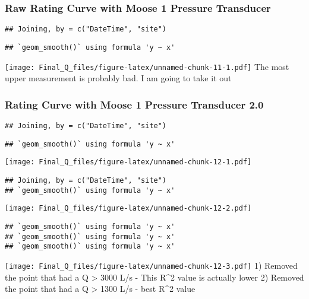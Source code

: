 \documentclass[
]{article}
\begin{document}
\hypertarget{raw-rating-curve-with-moose-1-pressure-transducer}{%
\subsubsection{Raw Rating Curve with Moose 1 Pressure
Transducer}\label{raw-rating-curve-with-moose-1-pressure-transducer}}

\begin{verbatim}
## Joining, by = c("DateTime", "site")
\end{verbatim}

\begin{verbatim}
## `geom_smooth()` using formula 'y ~ x'
\end{verbatim}

\texttt{[image: Final\_Q\_files/figure-latex/unnamed-chunk-11-1.pdf]} The
most upper measurement is probably bad. I am going to take it out

\hypertarget{rating-curve-with-moose-1-pressure-transducer-2.0}{%
\subsubsection{Rating Curve with Moose 1 Pressure Transducer
2.0}\label{rating-curve-with-moose-1-pressure-transducer-2.0}}

\begin{verbatim}
## Joining, by = c("DateTime", "site")
\end{verbatim}

\begin{verbatim}
## `geom_smooth()` using formula 'y ~ x'
\end{verbatim}

\texttt{[image: Final\_Q\_files/figure-latex/unnamed-chunk-12-1.pdf]}

\begin{verbatim}
## Joining, by = c("DateTime", "site")
## `geom_smooth()` using formula 'y ~ x'
\end{verbatim}

\texttt{[image: Final\_Q\_files/figure-latex/unnamed-chunk-12-2.pdf]}

\begin{verbatim}
## `geom_smooth()` using formula 'y ~ x'
## `geom_smooth()` using formula 'y ~ x'
## `geom_smooth()` using formula 'y ~ x'
\end{verbatim}

\texttt{[image: Final\_Q\_files/figure-latex/unnamed-chunk-12-3.pdf]} 1)
Removed the point that had a Q \textgreater{} 3000 L/s - This R\^{}2
value is actually lower 2) Removed the point that had a Q \textgreater{}
1300 L/s - best R\^{}2 value
\end{document}
